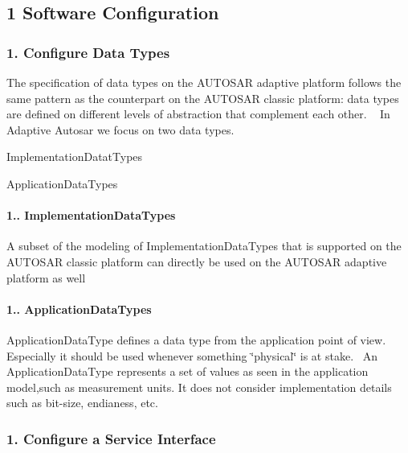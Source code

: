 \subsection*{1 Software Configuration}

\subsubsection*{1. Configure Data Types}

The specification of data types on the A\+U\+T\+O\+S\+AR adaptive platform follows the same pattern as the counterpart on the A\+U\+T\+O\+S\+AR classic platform\+: data types are defined on different levels of abstraction that complement each other. ~\newline
 In Adaptive Autosar we focus on two data types.
\begin{DoxyItemize}
\item Implementation\+Datat\+Types
\item Application\+Data\+Types
\end{DoxyItemize}

\paragraph*{1.. Implementation\+Data\+Types}

A subset of the modeling of Implementation\+Data\+Types that is supported on the A\+U\+T\+O\+S\+AR classic platform can directly be used on the A\+U\+T\+O\+S\+AR adaptive platform as well



\paragraph*{1.. Application\+Data\+Types}

Application\+Data\+Type defines a data type from the application point of view. Especially it should be used whenever something \char`\"{}physical\char`\"{} is at stake.~\newline
 An Application\+Data\+Type represents a set of values as seen in the application model,such as measurement units. It does not consider implementation details such as bit-\/size, endianess, etc.



\subsubsection*{1. Configure a Service Interface}

